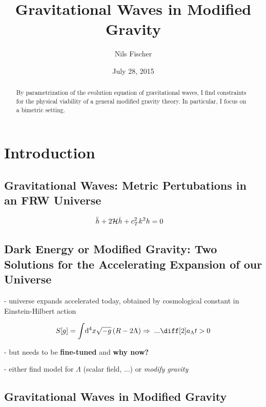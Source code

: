 \documentclass{scrreprt}
\title{Gravitational Waves in Modified Gravity}
\author{Nils Fischer}
\date{July 28, 2015}
\begin{document}
\maketitle

\begin{abstract}
	By parametrization of the evolution equation of gravitational waves, I find constraints for the physical viability of a general modified gravity theory. In particular, I focus on a bimetric setting.
\end{abstract}


\tableofcontents


\chapter{Introduction}


\section{Gravitational Waves: Metric Pertubations in an FRW Universe} %

\begin{align}\label{eq:evolution}
	\ddot{h} + 2 \mathcal{H} \dot{h} + c_T^2 k^2 h &= 0
\end{align}


\section{Dark Energy or Modified Gravity: Two Solutions for the Accelerating Expansion of our Universe} %

- universe expands accelerated today, obtained by cosmological constant in Einstein-Hilbert action

\begin{align}\label{eq:einstein_hilbert_action}
	S[g] = \int \! \mathrm{d}^4 x \sqrt{-g} \left( R - 2\Lambda \right)
	\Rightarrow \; ... \ddt{a_\Lambda} > 0
\end{align}

- but needs to be \textbf{fine-tuned} and \textbf{why now?}

- either find model for $\Lambda$ (scalar field, ...) or \emph{modify gravity}


\section{Gravitational Waves in Modified Gravity}
\end{document}
